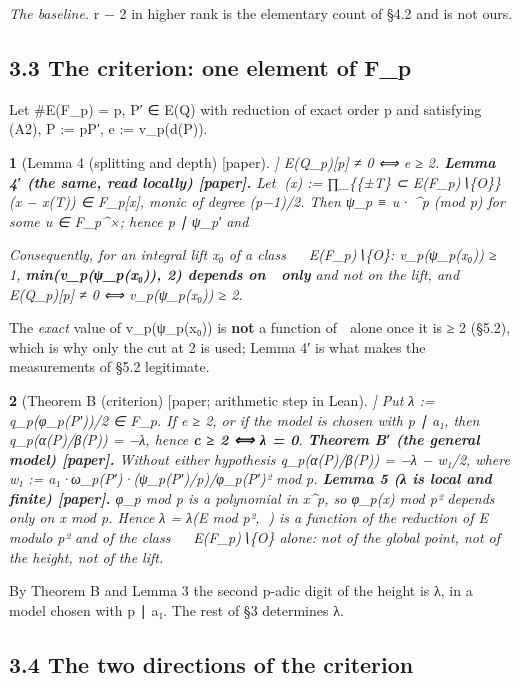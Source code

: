\documentclass[11pt,a4paper]{article}
\theoremstyle{named}
\newtheorem*{namedthm}{}
\newcommand{\dispf}[1]{\par\smallskip{\centering #1\par}\smallskip}
\begin{document}
\textit{The baseline.} r − 2 in higher rank is the elementary count of §4.2 and is not ours.

\subsection*{3.3 The criterion: one element of F\_p}

Let \#E(F\_p) = p, P′ ∈ E(Q) with reduction of exact order p and satisfying (A2), P := pP′, e := v\_p(d(P)).

\begin{namedthm}[Lemma 4 (splitting and depth) [paper]]
E(Q\_p)[p] ≠ 0 ⟺ e ≥ 2.
\textbf{Lemma 4′ (the same, read locally) [paper].} Let (x) := ∏\_\{\{±T\} ⊂ E(F\_p)∖\{O\}\} (x − x(T)) ∈ F\_p[x], monic of degree (p−1)/2. Then ψ\_p ≡ u·\textasciicircum{}p (mod p) for some u ∈ F\_p\textasciicircum{}×; hence p ∣ ψ\_p′ and
\dispf{p² ∣ ψ\_p(x₀ + pk) − ψ\_p(x₀)  for all x₀, k ∈ Z\_p.}
Consequently, for an integral lift x₀ of a class  ∈ E(F\_p)∖\{O\}: v\_p(ψ\_p(x₀)) ≥ 1, \textbf{min(v\_p(ψ\_p(x₀)), 2) depends on  only} and not on the lift, and E(Q\_p)[p] ≠ 0 ⟺ v\_p(ψ\_p(x₀)) ≥ 2.
\end{namedthm}

The \textit{exact} value of v\_p(ψ\_p(x₀)) is \textbf{not} a function of  alone once it is ≥ 2 (§5.2), which is why only the cut at 2 is used; Lemma 4′ is what makes the measurements of §5.2 legitimate.

\begin{namedthm}[Theorem B (criterion) [paper; arithmetic step in Lean]]
Put λ := q\_p(φ\_p(P′))/2 ∈ F\_p. If e ≥ 2, or if the model is chosen with p ∣ a₁, then q\_p(α(P)/β(P)) = −λ, hence \textbf{c ≥ 2 ⟺ λ = 0}.
\textbf{Theorem B′ (the general model) [paper].} Without either hypothesis q\_p(α(P)/β(P)) = −λ − w₁/2, where w₁ := a₁·ω\_p(P′)·(ψ\_p(P′)/p)/φ\_p(P′)² mod p.
\textbf{Lemma 5 (λ is local and finite) [paper].} φ\_p mod p is a polynomial in x\textasciicircum{}p, so φ\_p(x) mod p² depends only on x mod p. Hence λ = λ(E mod p², ) is a function of the reduction of E modulo p² and of the class  ∈ E(F\_p)∖\{O\} alone: not of the global point, not of the height, not of the lift.
\end{namedthm}

By Theorem B and Lemma 3 the second p-adic digit of the height is λ, in a model chosen with p ∣ a₁. The rest of §3 determines λ.

\subsection*{3.4 The two directions of the criterion}
\end{document}

